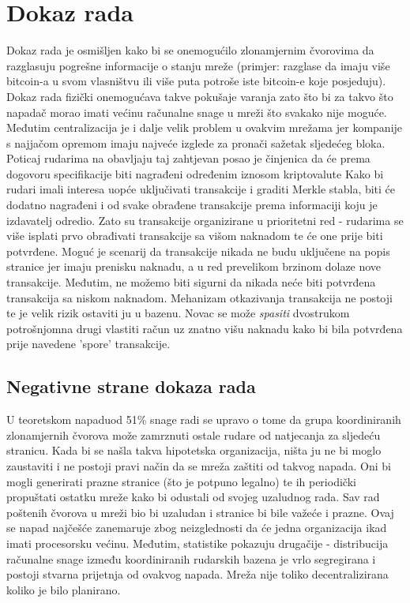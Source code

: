 \documentclass[utf8, zavrsni]{fer}
\begin{document}
\section{Dokaz rada}
Dokaz rada je osmišljen kako bi se onemogućilo zlonamjernim čvorovima da razglasuju pogrešne informacije o stanju mreže (primjer: razglase da imaju više bitcoin-a u svom vlasništvu ili više puta potroše iste bitcoin-e koje posjeduju). Dokaz rada fizički onemogućava takve pokušaje varanja zato što bi za takvo što napadač morao imati većinu računalne snage u mreži što svakako nije moguće. Međutim centralizacija je i dalje velik problem u ovakvim mrežama jer kompanije s najjačom opremom imaju najveće izglede za pronači sažetak sljedećeg bloka. Poticaj rudarima na obavljaju taj zahtjevan posao je činjenica da će prema dogovoru specifikacije biti nagrađeni određenim iznosom kriptovalute\footnotemark
{}
Kako bi rudari imali interesa uopće uključivati transakcije i graditi Merkle stabla, biti će dodatno nagrađeni i od svake obrađene transakcije prema informaciji koju je izdavatelj odredio. Zato su transakcije organizirane u prioritetni red - rudarima se više isplati prvo obrađivati transakcije sa višom naknadom te će one prije biti potvrđene. Moguć je scenarij da transakcije nikada ne budu uključene na popis stranice jer imaju prenisku naknadu, a u red prevelikom brzinom dolaze nove transakcije. Međutim, ne možemo biti sigurni da nikada neće biti potvrđena transakcija sa niskom naknadom. Mehanizam otkazivanja transakcija ne postoji te je velik rizik ostaviti ju u bazenu. Novac se može \textit{spasiti} dvostrukom potrošnjom\footnotemark na drugi vlastiti račun uz znatno višu naknadu kako bi bila potvrđena prije navedene 'spore' transakcije.

\subsection{Negativne strane dokaza rada}
U teoretskom napadu\footnotemark od 51\% snage radi se upravo o tome da grupa koordiniranih zlonamjernih čvorova može zamrznuti ostale rudare od natjecanja za sljedeću stranicu. Kada bi se našla takva hipotetska organizacija, ništa ju ne bi moglo zaustaviti i ne postoji pravi način da se mreža zaštiti od takvog napada. Oni bi mogli generirati prazne stranice (što je potpuno legalno) te ih periodički propuštati ostatku mreže kako bi odustali od svojeg uzaludnog rada. Sav rad poštenih čvorova u mreži bio bi uzaludan i stranice bi bile važeće i prazne. Ovaj se napad najčešće zanemaruje zbog neizglednosti da će jedna organizacija ikad imati procesorsku većinu. Međutim, statistike pokazuju drugačije - distribucija računalne snage između koordiniranih rudarskih bazena je vrlo segregirana i postoji stvarna prijetnja od ovakvog napada. Mreža nije toliko decentralizirana koliko je bilo planirano.
\end{document}
